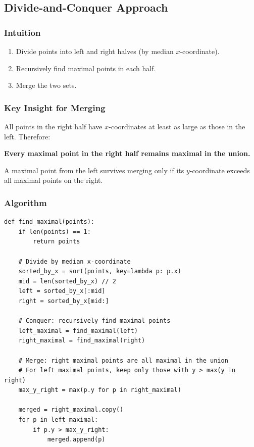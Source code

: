 \documentclass[11pt]{article}
\begin{document}
{\subsection*{Divide-and-Conquer Approach}

\subsubsection*{Intuition}
\begin{enumerate}
\item Divide points into left and right halves (by median $x$-coordinate).
\item Recursively find maximal points in each half.
\item Merge the two sets.
\end{enumerate}

\subsubsection*{Key Insight for Merging}
All points in the right half have $x$-coordinates at least as large as those in the left. Therefore:

\textbf{Every maximal point in the right half remains maximal in the union.}

A maximal point from the left survives merging only if its $y$-coordinate exceeds all maximal points on the right.

\subsubsection*{Algorithm}
\begin{lstlisting}
def find_maximal(points):
    if len(points) == 1:
        return points
    
    # Divide by median x-coordinate
    sorted_by_x = sort(points, key=lambda p: p.x)
    mid = len(sorted_by_x) // 2
    left = sorted_by_x[:mid]
    right = sorted_by_x[mid:]
    
    # Conquer: recursively find maximal points
    left_maximal = find_maximal(left)
    right_maximal = find_maximal(right)
    
    # Merge: right maximal points are all maximal in the union
    # For left maximal points, keep only those with y > max(y in right)
    max_y_right = max(p.y for p in right_maximal)
    
    merged = right_maximal.copy()
    for p in left_maximal:
        if p.y > max_y_right:
            merged.append(p)
    

\end{lstlisting}}
\end{document}
